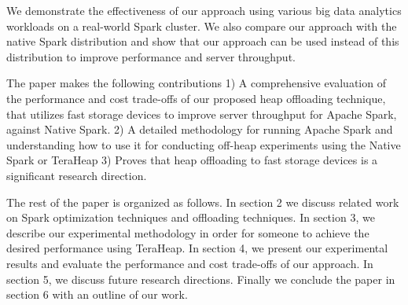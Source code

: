 We demonstrate the effectiveness of our approach using various big
data analytics workloads on a real-world Spark cluster. We also
compare our approach with the native Spark distribution and show that
our approach can be used instead of this distribution to improve
performance and server throughput.

The paper makes the following contributions 1) A comprehensive
evaluation of the performance and cost trade-offs of our proposed heap
offloading technique, that utilizes fast storage devices to improve
server throughput for Apache Spark, against Native Spark. 2) A
detailed methodology for running Apache Spark and understanding how to
use it for conducting off-heap experiments using the Native Spark or
TeraHeap 3) Proves that heap offloading to fast storage devices is a
significant research direction.

The rest of the paper is organized as follows. In section 2 we discuss
related work on Spark optimization techniques and offloading
techniques. In section 3, we describe our experimental methodology in
order for someone to achieve the desired performance using TeraHeap.
In section 4, we present our experimental results and evaluate the
performance and cost trade-offs of our approach. In section 5, we
discuss future research directions. Finally we conclude the paper in
section 6 with an outline of our work.
